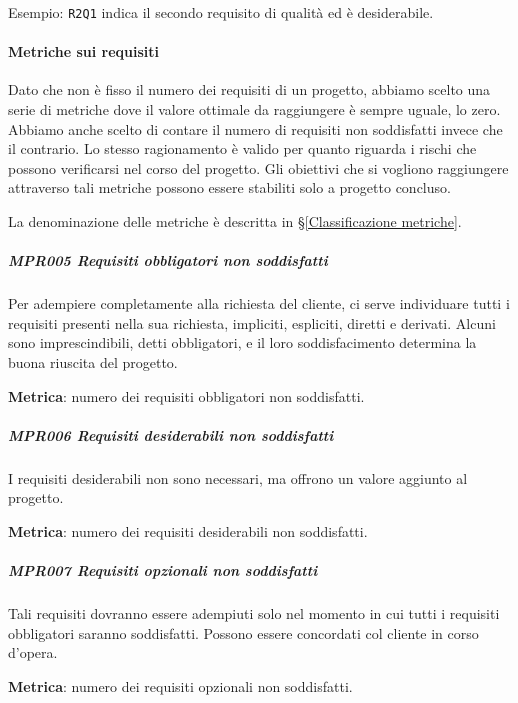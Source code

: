		Esempio: \texttt{R2Q1} indica il secondo requisito di qualità ed è desiderabile.


		\paragraph{Metriche sui requisiti}\label{MetricheAdR}
		Dato che non è fisso il numero dei requisiti di un progetto, abbiamo scelto una serie di metriche dove il valore ottimale da raggiungere è sempre uguale, lo zero. Abbiamo anche scelto di contare il numero di requisiti non soddisfatti invece che il contrario. Lo stesso ragionamento è valido per quanto	riguarda i rischi che possono verificarsi nel corso del progetto.
		Gli obiettivi che si vogliono raggiungere attraverso tali metriche possono essere stabiliti solo a progetto concluso.
		
		La denominazione delle metriche è descritta in \S\ref{Classificazione metriche}.
		
		\subparagraph{MPR005 Requisiti obbligatori non soddisfatti}
		Per adempiere completamente alla richiesta del cliente, ci serve individuare tutti i requisiti presenti nella sua richiesta, impliciti, espliciti, diretti e derivati. Alcuni sono imprescindibili, detti obbligatori, e il loro soddisfacimento determina la buona riuscita del progetto.
		
		\textbf{Metrica}: numero dei requisiti obbligatori non soddisfatti.
		
		\subparagraph{MPR006 Requisiti desiderabili non soddisfatti}
		I requisiti desiderabili non sono necessari, ma offrono un valore aggiunto al progetto.
		
		\textbf{Metrica}: numero dei requisiti desiderabili non soddisfatti.
		
		\subparagraph{MPR007 Requisiti opzionali non soddisfatti}
		Tali requisiti dovranno essere adempiuti solo nel momento in cui tutti i requisiti obbligatori saranno soddisfatti.
		Possono essere concordati col cliente in corso d'opera.
		
		\textbf{Metrica}: numero dei requisiti opzionali non soddisfatti.
	

